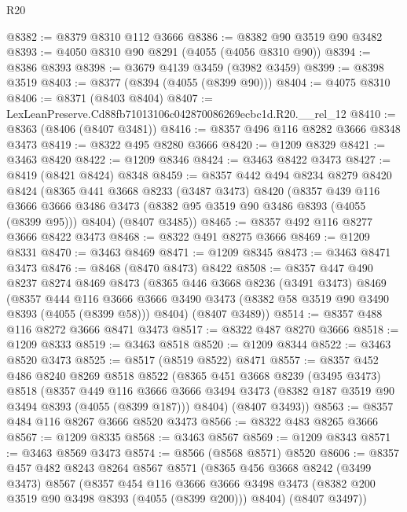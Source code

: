 \begin{lexlean}{R20}
\begin{coremodule}
@8382 := @8379 @8310 @112 @3666
@8386 := @8382 @90 @3519 @90 @3482
@8393 := @4050 @8310 @90 @8291 (@4055 (@4056 @8310 @90))
@8394 := @8386 @8393
@8398 := @3679 @4139 @3459 (@3982 @3459)
@8399 := @8398 @3519
@8403 := @8377 (@8394 (@4055 (@8399 @90)))
@8404 := @4075 @8310
@8406 := @8371 (@8403 @8404)
@8407 := LexLeanPreserve.Cd88fb71013106c042870086269ecbc1d.R20.__rel_12
@8410 := @8363 (@8406 (@8407 @3481))
@8416 := @8357 @496 @116 @8282 @3666 @8348 @3473
@8419 := @8322 @495 @8280 @3666
@8420 := @1209 @8329
@8421 := @3463 @8420
@8422 := @1209 @8346
@8424 := @3463 @8422 @3473
@8427 := @8419 (@8421 @8424) @8348
@8459 := @8357
    @442
    @494
    @8234
    @8279
    @8420
    @8424
    (@8365
      @441
      @3668
      @8233
      (@3487 @3473)
      @8420
      (@8357
        @439
        @116
        @3666
        @3666
        @3486
        @3473
        (@8382 @95 @3519 @90 @3486 @8393 (@4055 (@8399 @95)))
        @8404)
      (@8407 @3485))
@8465 := @8357 @492 @116 @8277 @3666 @8422 @3473
@8468 := @8322 @491 @8275 @3666
@8469 := @1209 @8331
@8470 := @3463 @8469
@8471 := @1209 @8345
@8473 := @3463 @8471 @3473
@8476 := @8468 (@8470 @8473) @8422
@8508 := @8357
    @447
    @490
    @8237
    @8274
    @8469
    @8473
    (@8365
      @446
      @3668
      @8236
      (@3491 @3473)
      @8469
      (@8357
        @444
        @116
        @3666
        @3666
        @3490
        @3473
        (@8382 @58 @3519 @90 @3490 @8393 (@4055 (@8399 @58)))
        @8404)
      (@8407 @3489))
@8514 := @8357 @488 @116 @8272 @3666 @8471 @3473
@8517 := @8322 @487 @8270 @3666
@8518 := @1209 @8333
@8519 := @3463 @8518
@8520 := @1209 @8344
@8522 := @3463 @8520 @3473
@8525 := @8517 (@8519 @8522) @8471
@8557 := @8357
    @452
    @486
    @8240
    @8269
    @8518
    @8522
    (@8365
      @451
      @3668
      @8239
      (@3495 @3473)
      @8518
      (@8357
        @449
        @116
        @3666
        @3666
        @3494
        @3473
        (@8382 @187 @3519 @90 @3494 @8393 (@4055 (@8399 @187)))
        @8404)
      (@8407 @3493))
@8563 := @8357 @484 @116 @8267 @3666 @8520 @3473
@8566 := @8322 @483 @8265 @3666
@8567 := @1209 @8335
@8568 := @3463 @8567
@8569 := @1209 @8343
@8571 := @3463 @8569 @3473
@8574 := @8566 (@8568 @8571) @8520
@8606 := @8357
    @457
    @482
    @8243
    @8264
    @8567
    @8571
    (@8365
      @456
      @3668
      @8242
      (@3499 @3473)
      @8567
      (@8357
        @454
        @116
        @3666
        @3666
        @3498
        @3473
        (@8382 @200 @3519 @90 @3498 @8393 (@4055 (@8399 @200)))
        @8404)
      (@8407 @3497))

\end{coremodule}
\end{lexlean}
